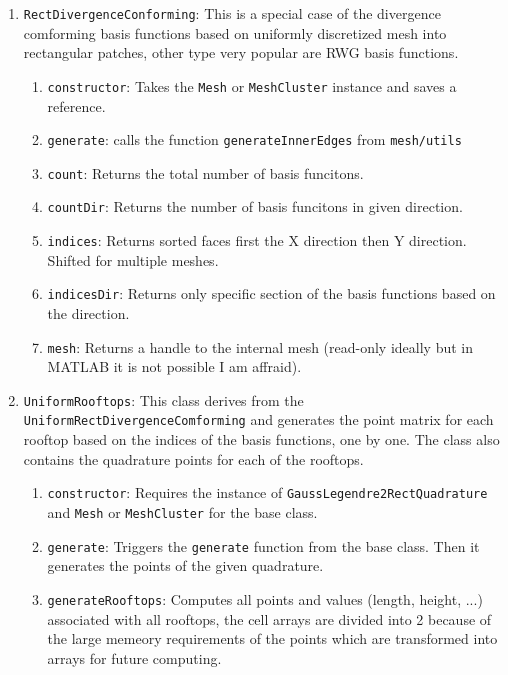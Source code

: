 \documentclass[9pt]{article}
\begin{document}
    \begin{enumerate}[label=\Roman*.]
        \item \texttt{RectDivergenceConforming}: This is a special case of the divergence comforming basis functions based on uniformly discretized mesh into rectangular patches, other type very popular are RWG basis functions.
        \begin{enumerate}[label=\roman*.]
            \item \texttt{constructor}: Takes the \texttt{Mesh} or \texttt{MeshCluster} instance and saves a reference.
            \item \texttt{generate}: calls the function \texttt{generateInnerEdges} from \texttt{mesh/utils}
            \item \texttt{count}: Returns the total number of basis funcitons.
            \item \texttt{countDir}: Returns the number of basis funcitons in given direction.
            \item \texttt{indices}: Returns sorted faces first the X direction then Y direction. Shifted for multiple meshes.
            \item \texttt{indicesDir}: Returns only specific section of the basis functions based on the direction.
            \item \texttt{mesh}: Returns a handle to the internal mesh (read-only ideally but in MATLAB it is not possible I am affraid).
        \end{enumerate}
        \item \texttt{UniformRooftops}: This class derives from the \texttt{UniformRectDivergenceComforming} and generates the point matrix for each rooftop based on the indices of the basis functions, one by one. The class also contains the quadrature points for each of the rooftops.
        \begin{enumerate}[label=\roman*.]
            \item \texttt{constructor}: Requires the instance of \texttt{GaussLegendre2RectQuadrature} and \texttt{Mesh} or \texttt{MeshCluster} for the base class.
            \item \texttt{generate}: Triggers the \texttt{generate} function from the base class. Then it generates the points of the given quadrature. 
            \item \texttt{generateRooftops}: Computes all points and values (length, height, ...) associated with all rooftops, the cell arrays are divided into 2 because of the large memeory requirements of the points which are transformed into arrays for future computing.

\end{enumerate}
\end{enumerate}
\end{document}
